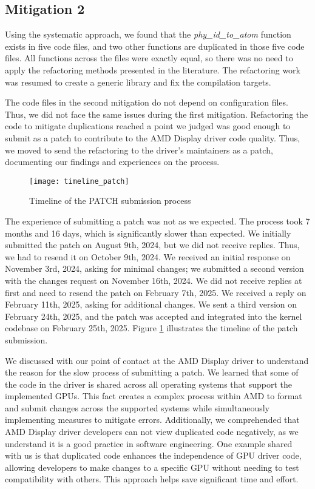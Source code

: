 \subsection{Mitigation 2}

Using the systematic approach, we found that the \textit{phy\_id\_to\_atom}
function exists in five code files, and two other functions are duplicated 
in those five code files. All functions across the files were exactly equal, 
so there was no need to apply the refactoring methods presented in the literature. 
The refactoring work was resumed to create a generic library and fix the compilation targets.

The code files in the second mitigation do not depend on configuration files. Thus, 
we did not face the same issues during the first mitigation. Refactoring the code 
to mitigate duplications reached a point we judged was good enough to submit as a 
patch to contribute to the AMD Display driver code quality. Thus, we moved to send 
the refactoring to the driver’s maintainers as a patch, documenting our findings and experiences 
on the process.

\begin{figure}
\texttt{[image: timeline\_patch]}
\caption{Timeline of the PATCH submission process}
\label{fig:timeline}
\end{figure}

The experience of submitting a patch was not as we expected. The process took 7 months 
and 16 days, which is significantly slower than expected. We initially submitted the 
patch on August 9th, 2024, but we did not receive replies. Thus, we had to resend it 
on October 9th, 2024. We received an initial response on November 3rd, 2024, asking for 
minimal changes; we submitted a second version with the changes request on November 16th, 2024. 
We did not receive replies at first and need to resend the patch on February 7th, 2025. 
We received a reply on February 11th, 2025, asking for additional changes. We sent a third 
version on February 24th, 2025, and the patch was accepted and integrated into the kernel 
codebase on February 25th, 2025. Figure \ref{fig:timeline} illustrates the timeline of 
the patch submission.

We discussed with our point of contact at the AMD Display driver to understand the reason 
for the slow process of submitting a patch. We learned that some of the code in the driver 
is shared across all operating systems that support the implemented GPUs. This fact creates 
a complex process within AMD to format and submit changes across the supported systems while 
simultaneously implementing measures to mitigate errors. Additionally, we comprehended that 
AMD Display driver developers can not view duplicated code negatively, as we understand it 
is a good practice in software engineering. One example shared with us is that duplicated 
code enhances the independence of GPU driver code, allowing developers to make changes to a 
specific GPU without needing to test compatibility with others. 
This approach helps save significant time and effort.

